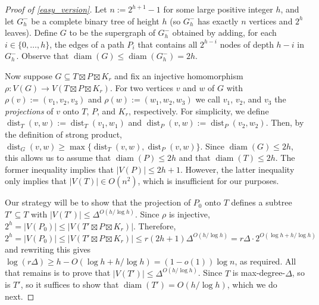 \documentclass{patmorin}
\newcommand{\defin}[1]{\emph{\color{brightmaroon}#1}}
\DeclareMathOperator{\dist}{dist}
\DeclareMathOperator{\diam}{diam}
\begin{document}
\begin{proof}[Proof of \cref{easy_version}]
  Let $n:=2^{h+1}-1$ for some large positive integer $h$, and let $G_h^-$ be a complete binary tree of height $h$ (so $G_h^-$ has exactly $n$ vertices and $2^h$ leaves).  Define $G$ to be the supergraph of $G_h^-$ obtained by adding, for each $i\in\{0,\ldots,h\}$, the edges of a path $P_i$ that contains all $2^{h-i}$ nodes of depth $h-i$ in $G_h^-$.  Observe that $\diam(G)\le\diam(G_h^-)=2h$.

  Now suppose $G\subseteq T\boxtimes P\boxtimes K_r$ and fix an injective homomorphism $\rho:V(G)\to V(T\boxtimes P\boxtimes K_r)$.  For two vertices $v$ and $w$ of $G$ with $\rho(v):=(v_1,v_2,v_3)$ and $\rho(w):=(w_1,w_2,w_3)$ we call $v_1$, $v_2$, and $v_3$ the \defin{projections} of $v$ onto $T$, $P$, and $K_r$, respectively.  For simplicity, we define $\dist_T(v,w):=\dist_T(v_1,w_1)$ and $\dist_P(v,w):=\dist_P(v_2,w_2)$.  Then, by the definition of strong product, $\dist_G(v,w)\ge \max\{\dist_T(v,w),\dist_P(v,w)\}$.  Since $\diam(G)\le 2h$, this allows us to assume that $\diam(P)\le 2h$ and that $\diam(T)\le 2h$.  The former inequality implies that $|V(P)|\le 2h+1$.  However, the latter inequality only implies that $|V(T)|\in O(n^2)$, which is insufficient for our purposes.

  Our strategy will be to show that the projection of $P_0$ onto $T$ defines a subtree $T'\subseteq T$ with $|V(T')|\le \Delta^{O(h/\log h)}$.  Since $\rho$ is injective, $2^h=|V(P_0)|\le |V(T'\boxtimes P\boxtimes K_r)|$. Therefore,
  \[
    2^h = |V(P_0)| \le |V(T'\boxtimes P\boxtimes K_r)| \le r(2h+1)\Delta^{O(h/\log h)} = r\Delta\cdot 2^{O(\log h + h/\log h)}
  \]
  and rewriting this gives $\log(r\Delta) \ge h-O(\log h+h/\log h)=(1-o(1))\log n$, as required.  All that remains is to prove that $|V(T')|\le\Delta^{O(h/\log h)}$.  Since $T$ is max-degree-$\Delta$, so is $T'$, so it suffices to show that $\diam(T')=O(h/\log h)$, which we do next.


\end{proof}
\end{document}
